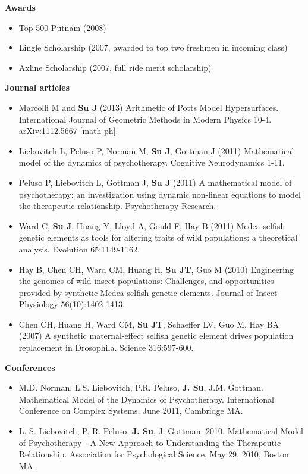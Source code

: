 \documentclass[letterpaper,10pt]{article}
\newcommand{\resheading}[1]{{\large \colorbox{mygrey}{\begin{minipage}{\textwidth}{\textbf{#1 \vphantom{p\^{E}}}}\end{minipage}}}}
\begin{document}
\resheading{Awards}
\begin{itemize}
	\item Top 500 Putnam (2008)
	\item Lingle Scholarship (2007, awarded to top two freshmen in incoming class)
	\item Axline Scholarship (2007, full ride merit scholarship)
\end{itemize}

\pagebreak
\resheading{Journal articles}
\begin{itemize}
	\item Marcolli M and \textbf{Su J} (2013) Arithmetic of Potts Model Hypersurfaces.  International Journal of Geometric Methods in Modern Physics 10-4.  arXiv:1112.5667 [math-ph].
	\item Liebovitch L, Peluso P, Norman M, \textbf{Su J}, Gottman J (2011) Mathematical model of the dynamics of psychotherapy.  Cognitive Neurodynamics 1-11.
	\item Peluso P, Liebovitch L, Gottman J, \textbf{Su J} (2011) A mathematical model of psychotherapy: an investigation using dynamic non-linear equations to model the therapeutic relationship.  Psychotherapy Research.
	\item Ward C, \textbf{Su J}, Huang Y, Lloyd A, Gould F, Hay B (2011) Medea selfish genetic elements as tools for altering traits of wild populations: a theoretical analysis.  Evolution 65:1149-1162.
	\item Hay B, Chen CH, Ward CM, Huang H, \textbf{Su JT}, Guo M (2010) Engineering the genomes of wild insect populations: Challenges, and opportunities provided by synthetic Medea selfish genetic elements.  Journal of Insect Physiology 56(10):1402-1413.
	\item Chen CH, Huang H, Ward CM, \textbf{Su JT}, Schaeffer LV, Guo M, Hay BA (2007) A synthetic maternal-effect selfish genetic element drives population replacement in Drosophila. Science 316:597-600.
\end{itemize}

\resheading{Conferences}
\begin{itemize}
	\item M.D. Norman, L.S. Liebovitch, P.R. Peluso, \textbf{J. Su}, J.M. Gottman.  Mathematical Model of the Dynamics of Psychotherapy.  International Conference on Complex Systems, June 2011, Cambridge MA.
	\item L. S. Liebovitch, P. R. Peluso, \textbf{J. Su}, J. Gottman. 2010. Mathematical Model of Psychotherapy - A New Approach to Understanding the Therapeutic Relationship. Association for Psychological Science, May 29, 2010, Boston MA.
\end{itemize}
\end{document}
